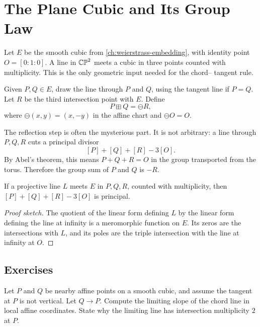 \chapter{The Plane Cubic and Its Group Law}
\label{ch:plane-cubic-group}

Let \(E\) be the smooth cubic from \cref{ch:weierstrass-embedding}, with identity
point \(O=[0:1:0]\).  A line in \(\mathbb{CP}^2\) meets a cubic in three points counted
with multiplicity.  This is the only geometric input needed for the chord--
tangent rule.

\begin{definition}
Given \(P,Q\in E\), draw the line through \(P\) and \(Q\), using the tangent line
if \(P=Q\).  Let \(R\) be the third intersection point with \(E\).  Define
\[
  P\boxplus Q=\ominus R,
\]
where \(\ominus(x,y)=(x,-y)\) in the affine chart and \(\ominus O=O\).
\end{definition}

\begin{center}
\resizebox{0.62\linewidth}{!}{\classicChordDiagram}
\end{center}

The reflection step is often the mysterious part.  It is not arbitrary: a line
through \(P,Q,R\) cuts a principal divisor
\[
  [P]+[Q]+[R]-3[O].
\]
By Abel's theorem, this means \(P+Q+R=O\) in the group transported from the torus.
Therefore the group sum of \(P\) and \(Q\) is \(-R\).

\begin{proposition}
\label{prop:line-divisor}
If a projective line \(L\) meets \(E\) in \(P,Q,R\), counted with multiplicity,
then \([P]+[Q]+[R]-3[O]\) is principal.
\end{proposition}

\begin{proof}[Proof sketch]
The quotient of the linear form defining \(L\) by the linear form defining the
line at infinity is a meromorphic function on \(E\).  Its zeros are the
intersections with \(L\), and its poles are the triple intersection with the line
at infinity at \(O\).
\end{proof}

\section*{Exercises}

\begin{exercise}
Let \(P\) and \(Q\) be nearby affine points on a smooth cubic, and assume the
tangent at \(P\) is not vertical.  Let \(Q\to P\).  Compute the limiting slope
of the chord line in local affine coordinates.  State why the limiting line has
intersection multiplicity \(2\) at \(P\).
\end{exercise}

